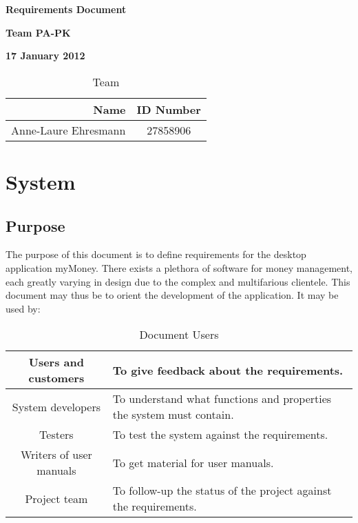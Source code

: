 \documentclass[11pt]{article}
\newcounter{use case ID}
\begin{document}
\vspace*{0.5in}
\centerline{\bf\Large Requirements Document}

\vspace*{0.5in}
\centerline{\bf\Large Team PA-PK}

\vspace*{0.5in}
\centerline{\bf\Large 17 January 2012}

\vspace*{1.5in}
\begin{table}[htbp]
\caption{Team}
\begin{center}
\begin{tabular}{|r | c|}
\hline
Name & ID Number \\
\hline\hline
Anne-Laure Ehresmann & 27858906 \\
\hline
\end{tabular}
\end{center}
\end{table}

\tableofcontents
\listoffigures
\listoftables

\clearpage

\section{System}\subsection{Purpose}

The purpose of this document is to define requirements for the  desktop application myMoney.
There exists a plethora of software for money management, each greatly varying in design due to the complex and multifarious clientele. This document may thus be to orient the development of the application. It may be used by:

\begin{table}[htbp]
\caption{Document Users}
\begin{center}
\begin{tabular}{|c|p{10cm}|}
\hline
Users and customers       & To give feedback about the requirements. \\
\hline
System developers         & To understand what functions and properties the system must contain. \\
\hline
Testers                   & To test the system against the requirements. \\
\hline
Writers of user manuals   & To get material for user manuals. \\
\hline
Project team              & To follow-up the status of the project against the requirements. \\
\hline
\end{tabular}
\end{center}
\end{table}
\end{document}
